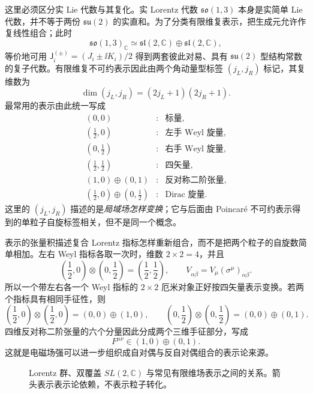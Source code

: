 这里必须区分实 Lie 代数与其复化。实 Lorentz 代数 $\mathfrak{so}(1,3)$ 本身是实简单 Lie 代数，并不等于两份 $\mathfrak{su}(2)$ 的实直和。为了分类有限维复表示，把生成元允许作复线性组合；此时
\begin{equation*}
 \mathfrak{so}(1,3)_\mathbb C
 \simeq \mathfrak{sl}(2,\mathbb C)\oplus\mathfrak{sl}(2,\mathbb C),
\end{equation*}
等价地可用 $\mathsf J_i^{(\pm)}=(J_i\pm\ii K_i)/2$ 得到两套彼此对易、具有 $\mathfrak{su}(2)$ 型结构常数的复子代数。有限维复不可约表示因此由两个角动量型标签 $(j_L,j_R)$ 标记，其复维数为
\begin{equation}
 \boxed{\dim(j_L,j_R)=(2j_L+1)(2j_R+1).}
 \label{eq:lorentz-irrep-dimension-dp8}
\end{equation}
最常用的表示由此统一写成
\begin{equation}
 \begin{array}{ccl}
 (0,0) &:& \text{标量},\\[2pt]
 (\tfrac12,0) &:& \text{左手 Weyl 旋量},\\[2pt]
 (0,\tfrac12) &:& \text{右手 Weyl 旋量},\\[2pt]
 (\tfrac12,\tfrac12) &:& \text{四矢量},\\[2pt]
 (1,0)\oplus(0,1) &:& \text{反对称二阶张量},\\[2pt]
 (\tfrac12,0)\oplus(0,\tfrac12) &:& \text{Dirac 旋量}.
 \end{array}
 \label{eq:lorentz-irrep-dictionary-dp8}
\end{equation}
这里的 $(j_L,j_R)$ 描述的是\emph{局域场怎样变换}；它与后面由 Poincar\'e 不可约表示得到的单粒子自旋标签相关，但不是同一个概念。


表示的张量积描述复合 Lorentz 指标怎样重新组合，而不是把两个粒子的自旋数简单相加。左右 Weyl 指标各取一次时，维数 $2\times2=4$，并且
\begin{equation}
 \boxed{
 \left(\frac12,0\right)\otimes\left(0,\frac12\right)
 =\left(\frac12,\frac12\right),
 \qquad
 V_{\alpha\dot\beta}=V_\mu(\sigma^\mu)_{\alpha\dot\beta}.}
 \label{eq:weyl-vector-product-r68}
\end{equation}
所以一个带左右各一个 Weyl 指标的 $2\times2$ 厄米对象正好按四矢量表示变换。若两个指标具有相同手征性，则
\begin{equation}
 \boxed{
 \left(\frac12,0\right)\otimes\left(\frac12,0\right)
 =(0,0)\oplus(1,0),
 \qquad
 \left(0,\frac12\right)\otimes\left(0,\frac12\right)
 =(0,0)\oplus(0,1).}
 \label{eq:weyl-same-chirality-product-r68}
\end{equation}
四维反对称二阶张量的六个分量因此分成两个三维手征部分，写成
\begin{equation}
 \boxed{F^{\mu\nu}\in(1,0)\oplus(0,1).}
 \label{eq:twoform-chiral-decomposition-r68}
\end{equation}
这就是电磁场强可以进一步组织成自对偶与反自对偶组合的表示论来源。

\begin{figure}[htbp]
 \centering
 
 \caption{Lorentz 群、双覆盖 $SL(2,\mathbb C)$ 与常见有限维场表示之间的关系。箭头表示表示论依赖，不表示粒子转化。}
 \label{fig:lorentz-representation-map-dp8}
\end{figure}
